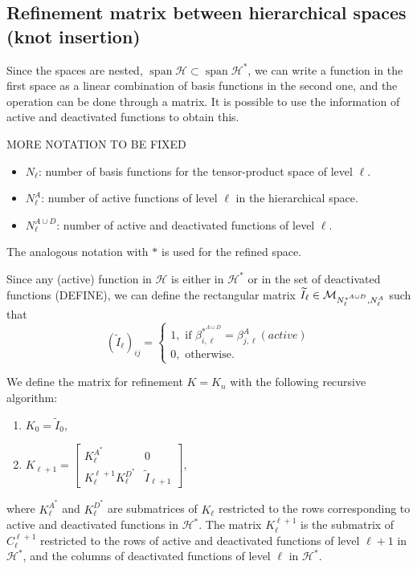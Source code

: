 \documentclass[a4paper]{siamltex1213}
\newcommand{\Rd}{\color{red}}
\renewcommand{\Rd}{\color{black}}
\DeclareMathOperator{\Span}{span}
\newcommand\HH{\mathcal H}
\let\tilde\widetilde
\begin{document}
\subsection{Refinement matrix between hierarchical spaces (knot insertion)}
Since the spaces are nested, $\Span\HH \subset \Span\HH^*$, we can write a function in the first space as a linear combination of basis functions in the second one, and the operation can be done through a matrix. It is possible to use the information of active and deactivated functions to obtain this. 

{\Rd MORE NOTATION TO BE FIXED
\begin{itemize}
\item $N_\ell$: number of basis functions for the tensor-product space of level $\ell$.
\item $N^A_\ell$: number of active functions of level $\ell$ in the hierarchical space.
\item $N^{A\cup D}_\ell$: number of active and deactivated functions of level $\ell$.
\end{itemize}
The analogous notation with $*$ is used for the refined space.
}

Since any (active) function in $\HH$ is either in $\HH^*$ or in the set of deactivated functions {\Rd (DEFINE)}, we can define the rectangular matrix $\tilde I_\ell \in {\cal M}_{N^{*^{A\cup D}}_{\ell}, N^A_\ell}$ such that 
\begin{equation*}
(\tilde I_\ell)_{ij} = \left \{ 
\begin{array}{l}
1, \text{ if }  \beta^{*^{A \cup D}}_{i,\ell} = \beta^A_{j,\ell} (active)\\
0, \text{ otherwise. }
\end{array}
\right.
\end{equation*}

We define the matrix for refinement $K = K_n$ with the following recursive algorithm:
\begin{enumerate}
\item $K_0 = \tilde I_0$,
\item $K_{\ell+1} = \left [ 
\begin{array}{cc}
K^{A^*}_\ell & 0 \\
K_\ell^{\ell+1} K^{D^*}_\ell & \tilde I_{\ell+1}
\end{array}
\right]$,
\end{enumerate}
where $K_\ell^{A^*}$ and $K_\ell^{D^*}$ are submatrices of $K_\ell$ restricted to the rows corresponding to {\Rd active and deactivated functions in $\HH^*$. The matrix $K_\ell^{\ell+1}$ is the submatrix of $C_\ell^{\ell+1}$ restricted to the rows of active and deactivated functions of level $\ell+1$ in $\HH^*$, and the columns of deactivated functions of level $\ell$ in $\HH^*$. }
\end{document}

